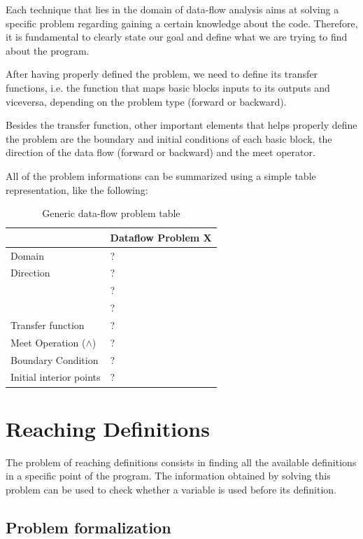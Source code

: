 \documentclass{article}
\begin{document}
 Each technique that lies in the domain of data-flow analysis aims at solving a specific problem regarding gaining a certain knowledge about the code. Therefore, it is fundamental to clearly state our goal and define what we are trying to find about the program.

 After having properly defined the problem, we need to define its transfer functions, i.e. the function that maps basic blocks inputs to its outputs and viceversa, depending on the problem type (forward or backward).

 Besides the transfer function, other important elements that helps properly define the problem are the boundary and initial conditions of each basic block, the direction of the data flow (forward or backward) and the meet operator.

 All of the problem informations can be summarized using a simple table representation, like the following:

\begin{table}[H]
\centering
\begin{tabular}{|p{}|p{}|}
\hline
 & \textbf{Dataflow Problem X} \\
\hline
Domain & ? \\
\hline
Direction & ? \\
 & ? \\
 & ? \\
\hline
Transfer function & ? \\
\hline
Meet Operation ($\wedge$) & ? \\
\hline
Boundary Condition & ? \\
\hline
Initial interior points & ? \\
\hline
\end{tabular}
\caption{Generic data-flow problem table}
\label{tab:dataflow_problem_x}
\end{table}

\clearpage

\section{Reaching Definitions}

The problem of reaching definitions consists in finding all the available definitions in a specific point of the program. The information obtained by solving this problem can be used to check whether a variable is used before its definition.

\subsection{Problem formalization}
\end{document}
